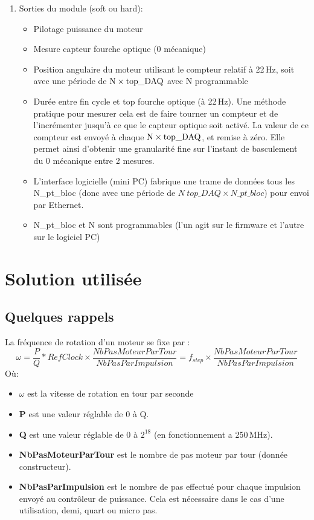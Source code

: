 \documentclass[11pt,a4paper,oneside,onecolumn]{article}
\begin{document}
\begin{enumerate}
\item Sorties du module (soft ou hard):
  \begin{itemize}
  \item Pilotage puissance du moteur
  \item Mesure capteur fourche optique (0 mécanique)
  \item Position angulaire du moteur utilisant le compteur relatif à 22\,Hz, soit avec une période de $\rm N \times top\_DAQ$ avec N programmable
  \item Durée entre fin cycle et top fourche optique (à 22\,Hz). Une méthode pratique pour mesurer cela est de faire tourner un compteur et de l'incrémenter jusqu'à ce que le capteur optique soit activé. La valeur de ce compteur est envoyé à chaque $\rm N \times top\_DAQ$, et remise à zéro. Elle permet ainsi d'obtenir une granularité fine sur l'instant de basculement du 0 mécanique entre 2 mesures.
  \item L'interface logicielle (mini PC) fabrique une trame de données tous les  N\_pt\_bloc (donc avec une période de $N\ top\_DAQ \times N\_pt\_bloc$) pour envoi par Ethernet.
  \item N\_pt\_bloc et N sont programmables (l'un agit sur le firmware et l'autre sur le logiciel PC)
  \end {itemize}
  
\end{enumerate}

\section{Solution utilisée}
\subsection{Quelques rappels}
La fréquence de rotation d'un moteur se fixe par :
\begin{equation}
 \omega=\dfrac{P}{Q}*RefClock  \times \dfrac{NbPasMoteurParTour}{NbPasParImpulsion}=f_{step} \times \dfrac{NbPasMoteurParTour}{NbPasParImpulsion}
\end{equation}
Où:
\begin{itemize}
 \item \textbf{$\omega$} est la vitesse de rotation en tour par seconde
 \item \textbf{P} est une valeur réglable de 0 à Q.
 \item \textbf{Q} est une valeur réglable de 0 à $2^{18}$ (en fonctionnement a 250\,MHz).
 \item \textbf{NbPasMoteurParTour} est le nombre de pas moteur par tour (donnée constructeur).
 \item \textbf{NbPasParImpulsion} est le nombre de pas effectué pour chaque impulsion envoyé au contrôleur de puissance. Cela est nécessaire dans le cas d'une utilisation, demi, quart ou micro pas.
\end{itemize}
\end{document}
